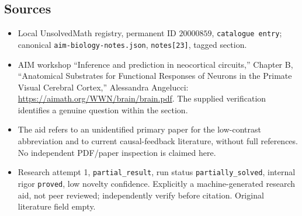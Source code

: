 \documentclass[11pt]{article}
\begin{document}
\subsection{Sources}
\begin{itemize}
\item Local UnsolvedMath registry, permanent ID $20000859$, \texttt{catalogue entry}; canonical \texttt{aim-biology-notes.json}, \texttt{notes[23]}, tagged section.
\item AIM workshop ``Inference and prediction in neocortical circuits,'' Chapter B, ``Anatomical Substrates for Functional Responses of Neurons in the Primate Visual Cerebral Cortex,'' Alessandra Angelucci: \url{https://aimath.org/WWN/brain/brain.pdf}. The supplied verification identifies a genuine question within the section.
\item The aid refers to an unidentified primary paper for the low-contrast abbreviation and to current causal-feedback literature, without full references. No independent PDF/paper inspection is claimed here.
\item Research attempt 1, \texttt{partial\_result}, run status \texttt{partially\_solved}, internal rigor \texttt{proved}, low novelty confidence. Explicitly a machine-generated research aid, not peer reviewed; independently verify before citation. Original literature field empty.
\end{itemize}
\end{document}
